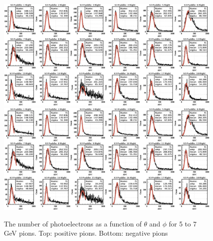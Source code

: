 \begin{figure}
	\centering
	\includegraphics[width=0.98\columnwidth,keepaspectratio]{img/pipnphe.png}
	\includegraphics[width=0.98\columnwidth,keepaspectratio]{img/pimnphe.png}
	\caption{The number of photoelectrons as a function of $\theta$ and $\phi$ for 5 to 7 GeV pions. Top: positive pions. Bottom: negative pions}
	\label{fig:neutronMM}
\end{figure}



